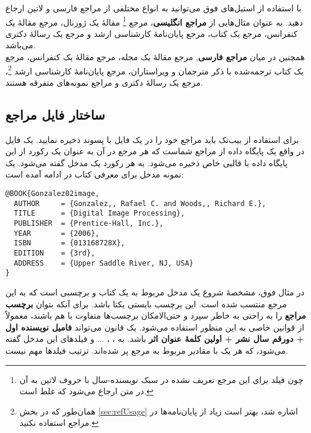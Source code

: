 با استفاده از استیل‌های فوق می‌توانید به انواع مختلفی از مراجع فارسی و لاتین ارجاع دهید.
به عنوان مثال‌هایی از
\textbf{مراجع انگلیسی}،
مرجع
\cite{Baker02limits}\footnote{چون فیلد  برای این مرجع تعریف نشده در سبک نویسنده-سال با حروف لاتین به آن در متن ارجاع می‌شود که غلط است.}
مقالهٔ یک ژورنال، مرجع
\cite{Amintoosi09video}
مقالهٔ یک کنفرانس، مرجع
یک کتاب، مرجع
\cite{Khalighi07MscThesis}
پایان‌نامهٔ کارشناسی ارشد و مرجع
یک رسالهٔ دکتری می‌باشد.\\
همچنین در میان
\textbf{مراجع فارسی},
مرجع
\cite{Vahedi87}
مقالهٔ یک مجله، مرجع
\cite{Amintoosi87afzayesh}
مقالهٔ یک کنفرانس، مرجع
\cite{Pedram80osool}
یک کتاب ترجمه‌شده با ذکر مترجمان و ویراستاران، مرجع
\cite{Pourmousa88mscThesis}
پایان‌نامهٔ کارشناسی ارشد%
\footnote{همان‌طور که در بخش
\ref{sec:refUsage}
اشاره شد، بهتر است زیاد از پایان‌نامه‌ها در مراجع استفاده نکنید.}،
مرجع
\cite{Omidali82phdThesis}
یک رسالهٔ دکتری و مراجع
\cite{persianbib87userguide, Khalighi87xepersian}
نمونه‌های متفرقه هستند.

\subsection{ساختار فایل مراجع}
برای استفاده از بیب‌تک باید مراجع خود را در یک فایل با پسوند  ذخیره نمایید. یک فایل  در واقع یک پایگاه داده از مراجع%
شماست که هر مرجع در آن به عنوان یک رکورد از این پایگاه داده
با قالبی خاص ذخیره می‌شود. به هر رکورد یک مدخل%
گفته می‌شود. یک نمونه مدخل برای معرفی کتاب  در ادامه آمده است:

\singlespacing
\begin{LTR}
\begin{verbatim}
@BOOK{Gonzalez02image,
  AUTHOR     = {Gonzalez,, Rafael C. and Woods,, Richard E.},
  TITLE      = {Digital Image Processing},
  PUBLISHER  = {Prentice-Hall, Inc.},
  YEAR       = {2006},
  ISBN       = {013168728X},
  EDITION    = {3rd},
  ADDRESS    = {Upper Saddle River, NJ, USA}
}
\end{verbatim}
\end{LTR}
\doublespacing

در مثال فوق،  مشخصهٔ شروع یک مدخل مربوط به یک کتاب و  برچسبی است که به این مرجع منتسب شده است.
 این برچسب بایستی یکتا باشد. برای آنکه بتوان
\textbf{برچسب مراجع}
 را به راحتی به خاطر سپرد و حتی‌الامکان برچسب‌ها متفاوت با هم باشند، معمولاً از قوانین خاصی به این منظور استفاده می‌شود. یک قانون می‌تواند
\textbf{فامیل نویسنده اول + دورقم سال نشر + اولین کلمهٔ عنوان اثر}
باشد. به
، ، $\dots$ و 
فیلدهای این مدخل گفته می‌شود، که هر یک با مقادیر مربوط به مرجع پر شده‌اند. ترتیب فیلدها مهم نیست. 

